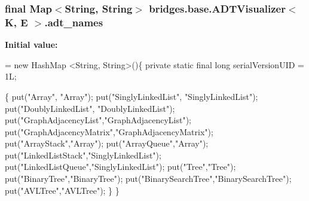 \subsubsection[{adt\+\_\+names}]{\setlength{\rightskip}{0pt plus 5cm}final Map$<$String, String$>$ {\bf bridges.\+base.\+A\+D\+T\+Visualizer}$<$ K, E $>$.adt\+\_\+names}\label{classbridges_1_1base_1_1_a_d_t_visualizer_a6646d020143637569d607fa109c71ff9}
{\bfseries Initial value\+:}
\begin{DoxyCode}
=
            \textcolor{keyword}{new} HashMap <String, String>()\{
                \textcolor{keyword}{private} \textcolor{keyword}{static} \textcolor{keyword}{final} \textcolor{keywordtype}{long} serialVersionUID = 1L;

                \{
                    put(\textcolor{stringliteral}{"Array"}, \textcolor{stringliteral}{"Array"});
                    put(\textcolor{stringliteral}{"SinglyLinkedList"}, \textcolor{stringliteral}{"SinglyLinkedList"});
                    put(\textcolor{stringliteral}{"DoublyLinkedList"}, \textcolor{stringliteral}{"DoublyLinkedList"});
                    put(\textcolor{stringliteral}{"GraphAdjacencyList"},\textcolor{stringliteral}{"GraphAdjacencyList"});
                    put(\textcolor{stringliteral}{"GraphAdjacencyMatrix"},\textcolor{stringliteral}{"GraphAdjacencyMatrix"});
                    put(\textcolor{stringliteral}{"ArrayStack"},\textcolor{stringliteral}{"Array"});
                    put(\textcolor{stringliteral}{"ArrayQueue"},\textcolor{stringliteral}{"Array"});
                    put(\textcolor{stringliteral}{"LinkedListStack"},\textcolor{stringliteral}{"SinglyLinkedList"});
                    put(\textcolor{stringliteral}{"LinkedListQueue"},\textcolor{stringliteral}{"SinglyLinkedList"});
                    put(\textcolor{stringliteral}{"Tree"},\textcolor{stringliteral}{"Tree"});
                    put(\textcolor{stringliteral}{"BinaryTree"},\textcolor{stringliteral}{"BinaryTree"});
                    put(\textcolor{stringliteral}{"BinarySearchTree"},\textcolor{stringliteral}{"BinarySearchTree"});
                    put(\textcolor{stringliteral}{"AVLTree"},\textcolor{stringliteral}{"AVLTree"});
                \}
            \}
\end{DoxyCode}
\hypertarget{classbridges_1_1base_1_1_a_d_t_visualizer_a6304c4131e3e7eb5953402368b0e9e3c}{}
